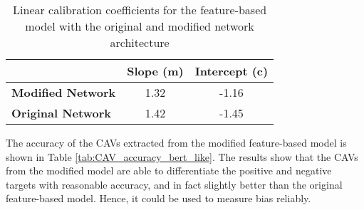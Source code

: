 \begin{table}[H]
    \centering
    \begin{tabular}{|l|c|c|}
        \hline
        \textbf{}                 & \textbf{Slope (m)} & \textbf{Intercept (c)} \\ \hline
        \textbf{Modified Network} & 1.32               & -1.16                  \\ \hline
        \textbf{Original Network} & 1.42               & -1.45                  \\ \hline
    \end{tabular}
    \caption{Linear calibration coefficients for the feature-based model with the original and modified network architecture}
    \label{tab:linear_regression_coefficients_bert_like}
\end{table}

The accuracy of the CAVs extracted from the modified feature-based model is shown in Table \ref{tab:CAV_accuracy_bert_like}. The results show that the CAVs from the modified model are able to differentiate the positive and negative targets with reasonable accuracy, and in fact slightly better than the original feature-based model. Hence, it could be used to measure bias reliably.

